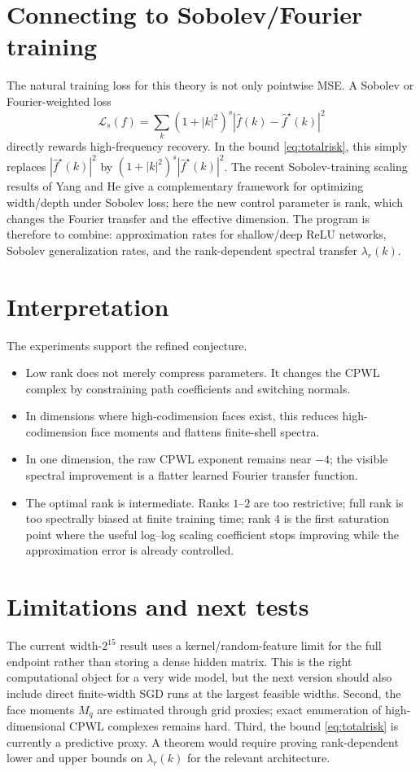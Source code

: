 \documentclass[10pt,twocolumn]{article}
\newcommand{\1}{\mathbf{1}}
\newcommand{\wh}{\widehat}
\begin{document}
\section{Connecting to Sobolev/Fourier training}
The natural training loss for this theory is not only pointwise MSE.  A Sobolev or Fourier-weighted loss
\begin{equation}
\mathcal{L}_{s}(f)=\sum_k (1+|k|^2)^s |\wh f(k)-\wh f^\star(k)|^2
\end{equation}
directly rewards high-frequency recovery.  In the bound \eqref{eq:totalrisk}, this simply replaces $|\wh f^\star(k)|^2$ by $(1+|k|^2)^s|\wh f^\star(k)|^2$.  The recent Sobolev-training scaling results of Yang and He give a complementary framework for optimizing width/depth under Sobolev loss; here the new control parameter is rank, which changes the Fourier transfer and the effective dimension.  The program is therefore to combine: approximation rates for shallow/deep ReLU networks, Sobolev generalization rates, and the rank-dependent spectral transfer $\lambda_r(k)$.

\section{Interpretation}
The experiments support the refined conjecture.
\begin{itemize}[leftmargin=1.2em,itemsep=1pt,topsep=2pt]
\item Low rank does not merely compress parameters.  It changes the CPWL complex by constraining path coefficients and switching normals.
\item In dimensions where high-codimension faces exist, this reduces high-codimension face moments and flattens finite-shell spectra.
\item In one dimension, the raw CPWL exponent remains near $-4$; the visible spectral improvement is a flatter learned Fourier transfer function.
\item The optimal rank is intermediate.  Ranks $1$--$2$ are too restrictive; full rank is too spectrally biased at finite training time; rank $4$ is the first saturation point where the useful log--log scaling coefficient stops improving while the approximation error is already controlled.
\end{itemize}

\section{Limitations and next tests}
The current width-$2^{15}$ result uses a kernel/random-feature limit for the full endpoint rather than storing a dense hidden matrix.  This is the right computational object for a very wide model, but the next version should also include direct finite-width SGD runs at the largest feasible widths.  Second, the face moments $M_q$ are estimated through grid proxies; exact enumeration of high-dimensional CPWL complexes remains hard.  Third, the bound \eqref{eq:totalrisk} is currently a predictive proxy.  A theorem would require proving rank-dependent lower and upper bounds on $\lambda_r(k)$ for the relevant architecture.
\end{document}
